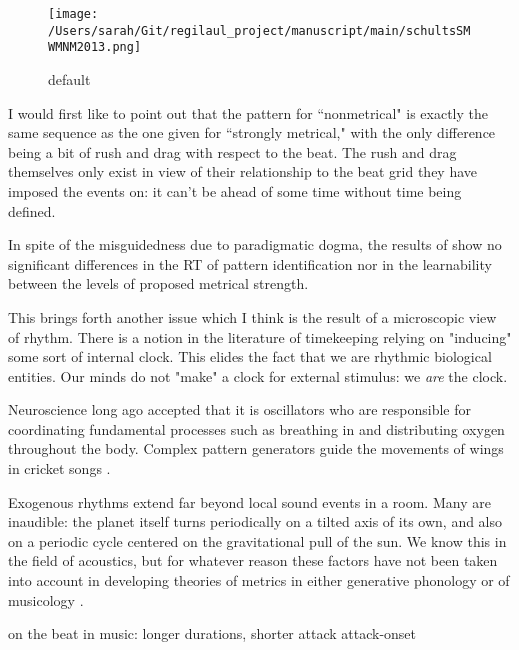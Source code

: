\begin{figure}[htbp]
\begin{center}
\texttt{[image: /Users/sarah/Git/regilaul\_project/manuscript/main/schultsSMWMNM2013.png]}
\caption{default}
\label{default}
\end{center}
\end{figure}

I would first like to point out that the pattern for ``nonmetrical" is exactly the same sequence as the one given for ``strongly metrical," with the only difference being a bit of rush and drag with respect to the beat. The rush and drag themselves only exist in view of their relationship to the beat grid they have imposed the events on: it can't be ahead of some time without time being defined. 

In spite of the misguidedness due to paradigmatic dogma, the results of \citep{katsuyuki1999} show no significant differences in the RT of pattern identification nor in the learnability between the levels of proposed metrical strength. 




This brings forth another issue which I think is the result of a microscopic view of rhythm. There is a notion in the literature of timekeeping relying on "inducing" some sort of internal clock. This elides the fact that we are rhythmic biological entities. Our minds do not "make" a clock for external stimulus: we {\it are} the clock. 


Neuroscience long ago accepted that it is oscillators who are responsible for coordinating fundamental processes such as breathing in and distributing oxygen throughout the body. Complex pattern generators guide the movements of wings in cricket songs \citep{buzsaki2006}. 


Exogenous rhythms extend far beyond local sound events in a room. Many are inaudible: the planet itself turns periodically on a tilted axis of its own, and also on a periodic cycle centered on the gravitational pull of the sun. We know this in the field of acoustics, but for whatever reason these factors have not been taken into account in developing theories of metrics in either generative phonology or of musicology \citep{berger2011}. 

\citep{palmer1997}
on the beat in music: longer durations, shorter attack 
attack-onset 


